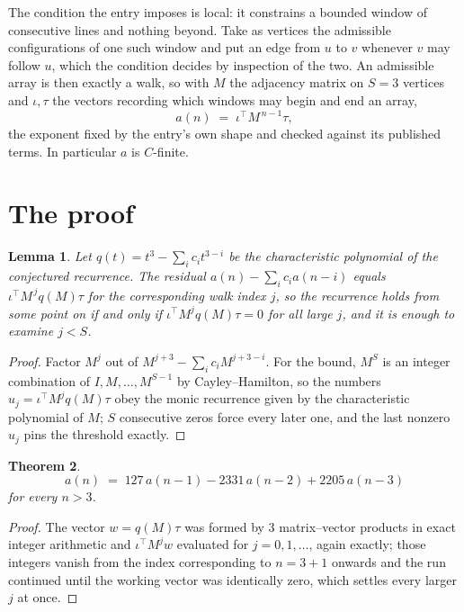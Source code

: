 \documentclass[11pt,a4paper]{article}
\theoremstyle{plain}
\newtheorem{theorem}{Theorem}
\newtheorem{lemma}[theorem]{Lemma}
\theoremstyle{definition}
\begin{document}
The condition the entry imposes is local: it constrains a bounded window of consecutive lines and nothing beyond. Take as
vertices the admissible configurations of one such window and put an edge from $u$ to $v$
whenever $v$ may follow $u$, which the condition decides by inspection of the two. An
admissible array is then exactly a walk, so with $M$ the adjacency matrix on $S=3$ vertices
and $\iota,\tau$ the vectors recording which windows may begin and end an array,
\[
a(n)\;=\;\iota^{\!\top}M^{\,n-1}\tau ,
\]
the exponent fixed by the entry's own shape and checked against its published terms. In
particular $a$ is $C$-finite.

\section{The proof}

\begin{lemma}\label{lem:crit}
Let $q(t)=t^{3}-\sum_i c_it^{3-i}$ be the characteristic polynomial of the
conjectured recurrence. The residual $a(n)-\sum_ic_ia(n-i)$ equals
$\iota^{\!\top}M^{\,j}q(M)\tau$ for the corresponding walk index $j$, so the recurrence
holds from some point on if and only if $\iota^{\!\top}M^{j}q(M)\tau=0$ for all large $j$,
and it is enough to examine $j<S$.
\end{lemma}

\begin{proof}
Factor $M^{j}$ out of $M^{j+3}-\sum_ic_iM^{j+3-i}$. For the bound, $M^{S}$
is an integer combination of $I,M,\dots,M^{S-1}$ by Cayley--Hamilton, so the numbers
$u_j=\iota^{\!\top}M^{j}q(M)\tau$ obey the monic recurrence given by the characteristic
polynomial of $M$; $S$ consecutive zeros force every later one, and the last nonzero $u_j$
pins the threshold exactly.
\end{proof}

\begin{theorem}
\[
a(n)\;=\;127\,a(n-1) - 2331\,a(n-2) + 2205\,a(n-3)
\]
for every $n>3$.
\end{theorem}

\begin{proof}
The vector $w=q(M)\tau$ was formed by $3$ matrix--vector products in exact integer
arithmetic and $\iota^{\!\top}M^{j}w$ evaluated for $j=0,1,\dots$, again exactly; those
integers vanish from the index corresponding to $n=3+1$ onwards and the run continued
until the working vector was identically zero, which settles every larger $j$ at once.
\end{proof}
\end{document}
